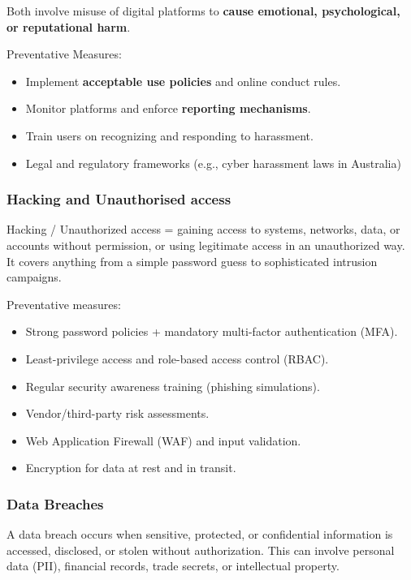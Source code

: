 Both involve misuse of digital platforms to \textbf{cause emotional, psychological, or reputational harm}.

Preventative Measures:

\begin{itemize}
    \item Implement \textbf{acceptable use policies} and online conduct rules.
    \item Monitor platforms and enforce \textbf{reporting mechanisms}.
    \item Train users on recognizing and responding to harassment.
    \item Legal and regulatory frameworks (e.g., cyber harassment laws in Australia)
\end{itemize}

\subsubsection{Hacking and Unauthorised access}

\indent

Hacking / Unauthorized access = gaining access to systems, networks, data, or accounts without permission, or using legitimate access in an unauthorized way. It covers anything from a simple password guess to sophisticated intrusion campaigns.

Preventative measures:

\begin{itemize}
    \item Strong password policies + mandatory multi-factor authentication (MFA).
    \item Least-privilege access and role-based access control (RBAC).
    \item Regular security awareness training (phishing simulations).
    \item Vendor/third-party risk assessments.
    \item Web Application Firewall (WAF) and input validation.
    \item Encryption for data at rest and in transit.
\end{itemize}

\subsubsection{Data Breaches}

\indent

A data breach occurs when sensitive, protected, or confidential information is accessed, disclosed, or stolen without authorization. This can involve personal data (PII), financial records, trade secrets, or intellectual property.

